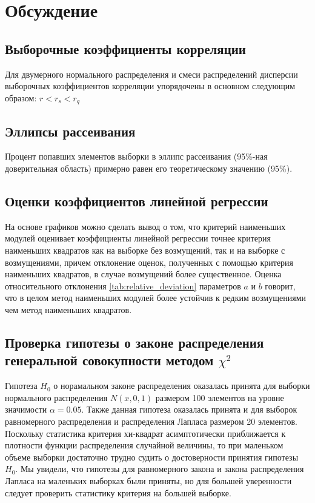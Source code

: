 \section{Обсуждение}

\subsection{Выборочные коэффициенты корреляции}

Для двумерного нормального распределения и смеси распределений дисперсии выборочных коэффициентов корреляции упорядочены в основном следующим образом: $r < r_s < r_q$

\subsection{Эллипсы рассеивания}

Процент попавших элементов выборки в эллипс рассеивания (95\%-ная доверительная область) примерно равен его теоретическому значению (95\%).

\subsection{Оценки коэффициентов линейной регрессии}

На основе графиков можно сделать вывод о том, что критерий наименьших модулей оценивает коэффициенты линейной регрессии точнее критерия наименьших квадратов как на выборке без возмущений, так и на выборке с возмущениями, причем отклонение оценок, полученных с помощью критерия наименьших квадратов, в случае возмущений более существенное. 
Оценка относительного отклонения \eqref{tab:relative_deviation} параметров $a$ и $b$ говорит, что в целом метод наименьших модулей более устойчив к редким возмущениями чем метод наименьших квадратов.


\subsection{Проверка гипотезы о законе распределения генеральной совокупности методом $\chi^2$ }

Гипотеза $H_0$ о норамальном законе распределения оказалась принята для выборки нормального распределения $N(x, 0, 1)$ размером 100 элементов на уровне значимости $\alpha = 0.05$. Также данная гипотеза оказалась принята и для выборок равномерного распределения и распределения Лапласа размером 20 элементов. \\
Поскольку статистика критерия хи-квадрат асимптотически приближается к плотности функции распределения случайной величины, то при маленьком объеме выборки достаточно трудно судить о достоверности принятия гипотезы $H_0$.
Мы увидели, что гипотезы для равномерного закона и закона распределения Лапласа на маленьких выборках были приняты, но для большей уверенности следует проверить статистику критерия на большей выборке.

